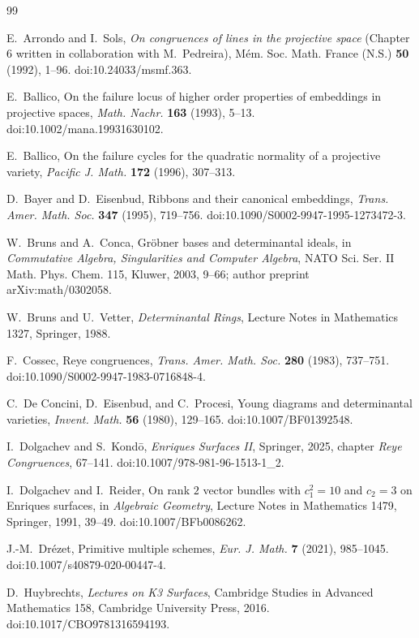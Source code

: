 \begin{thebibliography}{99}

E.~Arrondo and I.~Sols,
\emph{On congruences of lines in the projective space}
(Chapter 6 written in collaboration with M.~Pedreira),
M\'em. Soc. Math. France (N.S.) \textbf{50} (1992), 1--96.
doi:10.24033/msmf.363.

E.~Ballico,
On the failure locus of higher order properties of embeddings in
projective spaces,
\emph{Math. Nachr.} \textbf{163} (1993), 5--13.
doi:10.1002/mana.19931630102.

E.~Ballico,
On the failure cycles for the quadratic normality of a projective
variety,
\emph{Pacific J. Math.} \textbf{172} (1996), 307--313.

D.~Bayer and D.~Eisenbud,
Ribbons and their canonical embeddings,
\emph{Trans. Amer. Math. Soc.} \textbf{347} (1995), 719--756.
doi:10.1090/S0002-9947-1995-1273472-3.

W.~Bruns and A.~Conca,
Gr\"obner bases and determinantal ideals,
in \emph{Commutative Algebra, Singularities and Computer Algebra},
NATO Sci. Ser. II Math. Phys. Chem. 115, Kluwer, 2003, 9--66;
author preprint arXiv:math/0302058.

W.~Bruns and U.~Vetter,
\emph{Determinantal Rings},
Lecture Notes in Mathematics 1327, Springer, 1988.

F.~Cossec,
Reye congruences,
\emph{Trans. Amer. Math. Soc.} \textbf{280} (1983), 737--751.
doi:10.1090/S0002-9947-1983-0716848-4.

C.~De Concini, D.~Eisenbud, and C.~Procesi,
Young diagrams and determinantal varieties,
\emph{Invent. Math.} \textbf{56} (1980), 129--165.
doi:10.1007/BF01392548.

I.~Dolgachev and S.~Kond\=o,
\emph{Enriques Surfaces II},
Springer, 2025, chapter \emph{Reye Congruences}, 67--141.
doi:10.1007/978-981-96-1513-1\_2.

I.~Dolgachev and I.~Reider,
On rank $2$ vector bundles with $c_1^2=10$ and $c_2=3$ on Enriques
surfaces,
in \emph{Algebraic Geometry}, Lecture Notes in Mathematics 1479,
Springer, 1991, 39--49.
doi:10.1007/BFb0086262.

J.-M.~Dr\'ezet,
Primitive multiple schemes,
\emph{Eur. J. Math.} \textbf{7} (2021), 985--1045.
doi:10.1007/s40879-020-00447-4.

D.~Huybrechts,
\emph{Lectures on K3 Surfaces},
Cambridge Studies in Advanced Mathematics 158,
Cambridge University Press, 2016.
doi:10.1017/CBO9781316594193.


\end{thebibliography}
